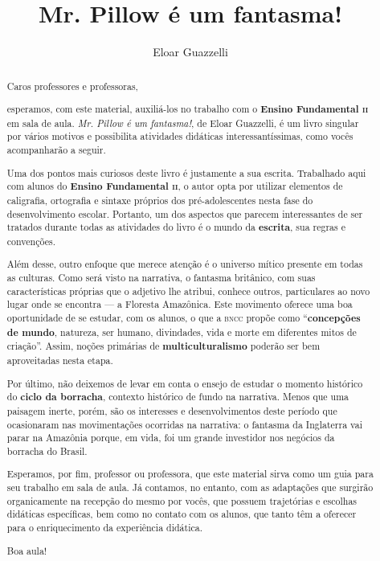 \documentclass[11pt]{extarticle}
\newcommand{\AutorLivro}{Eloar Guazzelli}
\newcommand{\TituloLivro}{Mr. Pillow é um fantasma!}
\newcommand{\colaborador}{Renier Silva}
\begin{document}
\title{\TituloLivro}
\author{\AutorLivro}
\def\authornotes{\colaborador}

\date{}
\maketitle


\tableofcontents




\begin{abstract}

Caros professores e professoras, 

esperamos, com este material,
auxiliá-los no trabalho com o \textbf{Ensino Fundamental \textsc{ii}} em sala de aula.
\textit{Mr. Pillow é um fantasma!}, de Eloar Guazzelli, é um livro singular
por vários motivos e possibilita atividades didáticas interessantíssimas,
como vocês acompanharão a seguir.

Uma dos pontos mais curiosos deste livro é justamente a sua escrita.
Trabalhado aqui com alunos do \textbf{Ensino Fundamental \textsc{ii}},
o autor opta por utilizar elementos de caligrafia, ortografia e sintaxe 
próprios dos pré-adolescentes nesta fase do desenvolvimento escolar.
Portanto, um dos aspectos que parecem interessantes de ser tratados durante
todas as atividades do livro é o mundo da \textbf{escrita}, sua regras
e convenções.

Além desse, outro enfoque que merece atenção é o universo mítico presente
em todas as culturas. Como será visto na narrativa, o fantasma britânico,
com suas características próprias que o adjetivo lhe atribui, conhece
outros, particulares ao novo lugar onde se encontra --- a Floresta Amazônica.
Este movimento oferece uma boa oportunidade de se estudar, com os alunos, 
o que a \textsc{bncc} propõe como ``\textbf{concepções de mundo}, natureza, ser humano, 
divindades, vida e morte em diferentes mitos de criação''. Assim, 
noções primárias de \textbf{multiculturalismo} poderão ser bem aproveitadas
nesta etapa.

Por último, não deixemos de levar em conta o ensejo de estudar o momento
histórico do \textbf{ciclo da borracha}, contexto histórico de fundo 
na narrativa. Menos que uma paisagem inerte, porém, são os interesses
e desenvolvimentos deste período que ocasionaram nas movimentações
ocorridas na narrativa: o fantasma da Inglaterra vai parar na Amazônia
porque, em vida, foi um grande investidor nos negócios da borracha do Brasil. 

Esperamos, por fim, professor ou professora, que este material sirva como um guia 
para seu trabalho em sala de aula. Já contamos, no entanto, com as adaptações
que surgirão organicamente na recepção do mesmo por vocês, que possuem 
trajetórias e escolhas didáticas específicas, bem como no contato com os 
alunos, que tanto têm a oferecer para o enriquecimento da experiência didática. 

Boa aula!

\end{abstract}
\end{document}
